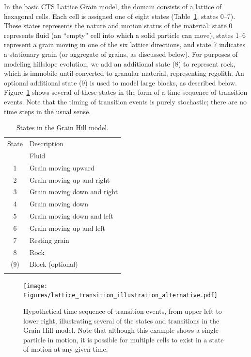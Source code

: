 \documentclass[esurf, manuscript]{copernicus}
\begin{document}
In the basic CTS Lattice Grain model, the domain consists of a lattice of hexagonal cells. Each cell is assigned one of eight states (Table~\ref{statetable}, states 0--7). These states represents the nature and motion status of the material: state 0 represents fluid  (an ``empty'' cell into which a solid particle can move), states 1--6 represent a grain moving in one of the six lattice directions, and state 7 indicates a stationary grain (or aggregate of grains, as discussed below). For purposes of modeling hillslope evolution, we add an additional state (8) to represent rock, which is immobile until converted to granular material, representing regolith. An optional additional state (9) is used to model large blocks, as described below. Figure~\ref{lattice} shows several of these states in the form of a time sequence of transition events. Note that the timing of transition events is purely stochastic; there are no time steps in the usual sense.


\begin{table}[t]
\caption{States in the Grain Hill model.}
\begin{tabular}{cl}
\tophline
State & Description \\
\middlehline
0 & Fluid \\
1 & Grain moving upward \\
2 & Grain moving up and right \\
3 & Grain moving down and right \\
4 & Grain moving down \\
5 & Grain moving down and left \\
6 & Grain moving up and left \\
7 & Resting grain \\
8 & Rock \\
(9) & Block (optional) \\
\bottomhline
\label{statetable}
\end{tabular}
\end{table}

\begin{figure}[t]
\texttt{[image: Figures/lattice\_transition\_illustration\_alternative.pdf]}
\caption{Hypothetical time sequence of transition events, from upper left to lower right, illustrating several of the states and transitions in the Grain Hill model. Note that although this example shows a single particle in motion, it is possible for multiple cells to exist in a state of motion at any given time.}
\label{lattice}
\end{figure}
\end{document}
